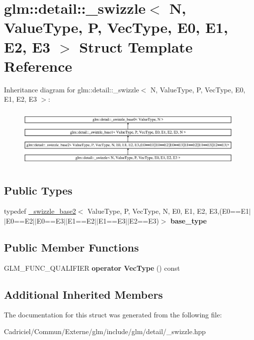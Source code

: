 \hypertarget{structglm_1_1detail_1_1__swizzle}{}\section{glm\+:\+:detail\+:\+:\+\_\+swizzle$<$ N, Value\+Type, P, Vec\+Type, E0, E1, E2, E3 $>$ Struct Template Reference}
\label{structglm_1_1detail_1_1__swizzle}
Inheritance diagram for glm\+:\+:detail\+:\+:\+\_\+swizzle$<$ N, Value\+Type, P, Vec\+Type, E0, E1, E2, E3 $>$\+:\begin{figure}[H]
\begin{center}
\leavevmode
\includegraphics[height=3.002681cm]{structglm_1_1detail_1_1__swizzle}
\end{center}
\end{figure}
\subsection*{Public Types}
\begin{DoxyCompactItemize}
\item 
typedef \hyperlink{structglm_1_1detail_1_1__swizzle__base2}{\+\_\+swizzle\+\_\+base2}$<$ Value\+Type, P, Vec\+Type, N, E0, E1, E2, E3,(E0==E1$\vert$$\vert$E0==E2$\vert$$\vert$E0==E3$\vert$$\vert$E1==E2$\vert$$\vert$E1==E3$\vert$$\vert$E2==E3)$>$ {\bfseries base\+\_\+type}\hypertarget{structglm_1_1detail_1_1__swizzle_acf7dfa9d7456eb833c247473c5a045f4}{}\label{structglm_1_1detail_1_1__swizzle_acf7dfa9d7456eb833c247473c5a045f4}

\end{DoxyCompactItemize}
\subsection*{Public Member Functions}
\begin{DoxyCompactItemize}
\item 
G\+L\+M\+\_\+\+F\+U\+N\+C\+\_\+\+Q\+U\+A\+L\+I\+F\+I\+ER {\bfseries operator Vec\+Type} () const \hypertarget{structglm_1_1detail_1_1__swizzle_a333cdd33d2fb442775cca23c77e63fca}{}\label{structglm_1_1detail_1_1__swizzle_a333cdd33d2fb442775cca23c77e63fca}

\end{DoxyCompactItemize}
\subsection*{Additional Inherited Members}


The documentation for this struct was generated from the following file\+:\begin{DoxyCompactItemize}
\item 
Cadriciel/\+Commun/\+Externe/glm/include/glm/detail/\+\_\+swizzle.\+hpp\end{DoxyCompactItemize}
